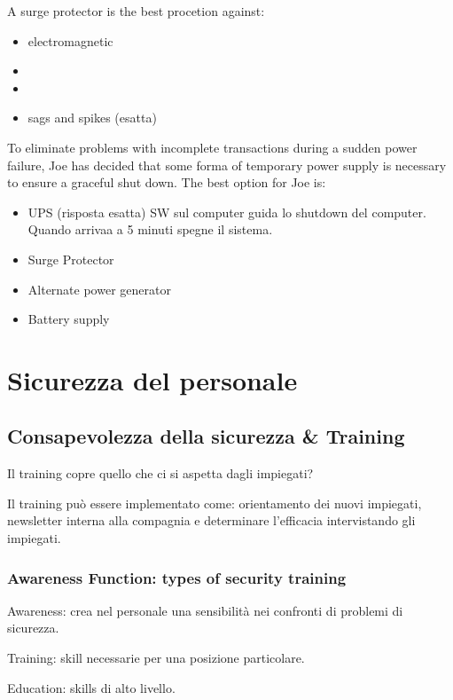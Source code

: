 A surge protector is the best procetion against:
\begin{itemize}
\item electromagnetic 
\item {}
\item
\item sags and spikes (esatta)
\end{itemize}



To eliminate problems with incomplete transactions during a sudden power 
failure, Joe has decided that some forma of temporary power supply is necessary 
to ensure a graceful shut down. The best option for Joe is:

\begin{itemize}
\item UPS (risposta esatta) %
SW sul computer guida lo shutdown del computer. Quando arrivaa a 5 minuti spegne 
il sistema.
\item Surge Protector 
\item Alternate power generator
\item Battery supply
\end{itemize}

\section{Sicurezza del personale}

\subsection{Consapevolezza della sicurezza \& Training}

Il training copre quello che ci si aspetta dagli impiegati?

Il training può essere implementato come: orientamento dei nuovi impiegati, 
newsletter interna alla compagnia e determinare l'efficacia intervistando gli 
impiegati.



\subsubsection{Awareness Function: types of security training}

Awareness: crea nel personale una sensibilità nei confronti di problemi di 
sicurezza.

Training: skill necessarie per una posizione particolare.

Education: skills di alto livello.
